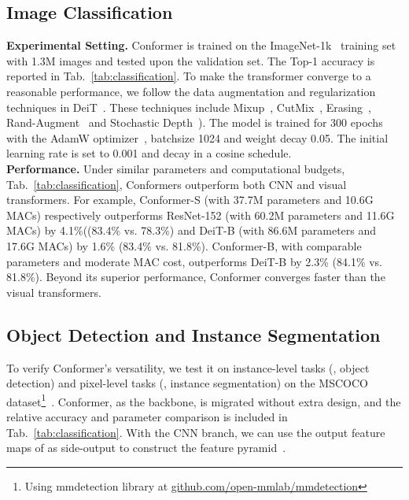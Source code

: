 \documentclass[10pt,twocolumn,letterpaper]{article}
\begin{document}
\subsection{Image Classification}

\noindent\textbf{Experimental Setting.} Conformer is trained on the ImageNet-1k~\cite{ImageNet2009} training set with 1.3M images and tested upon the validation set. The Top-1 accuracy is reported in Tab.~\ref{tab:classification}.
To make the transformer converge to a reasonable performance, we follow the data augmentation and regularization techniques in DeiT~\cite{DeiT2020}. 
These techniques include Mixup~\cite{Mixup2017}, CutMix~\cite{CutMix2019}, Erasing~\cite{Erasing2020}, Rand-Augment~\cite{RA2020} and Stochastic Depth~\cite{StochasticDepth2016}). The model is trained for 300 epochs with the AdamW optimizer~\cite{AdamW2017}, batchsize 1024 and weight decay 0.05. 
The initial learning rate is set to 0.001 and decay in a cosine schedule.
~\\

\noindent\textbf{Performance.} Under similar parameters and computational budgets, Tab.~\ref{tab:classification}, Conformers outperform both CNN and visual transformers. For example, Conformer-S (with 37.7M parameters and 10.6G MACs) respectively outperforms ResNet-152 (with 60.2M parameters and 11.6G MACs) by 4.1\%((83.4\% vs. 78.3\%) and DeiT-B (with 86.6M parameters and 17.6G MACs) by 1.6\% (83.4\% vs. 81.8\%). Conformer-B, with comparable parameters and moderate MAC cost, outperforms DeiT-B by 2.3\% (84.1\% vs. 81.8\%). Beyond its superior performance, Conformer converges faster than the visual transformers.

\subsection{Object Detection and Instance Segmentation}
To verify Conformer's versatility, we test it on instance-level tasks (, object detection) and pixel-level tasks (, instance segmentation) on the MSCOCO dataset\footnote{Using mmdetection library at \href{github.com/open-mmlab/mmdetection}{\color{magenta}github.com/open-mmlab/mmdetection}}~\cite{MSCOCO2014}. Conformer, as the backbone, is migrated without extra design, and the relative accuracy and parameter comparison is included in Tab.~\ref{tab:classification}. With the CNN branch, we can use the output feature maps of  as side-output to construct the feature pyramid~\cite{FPN2017}.
~\\
\end{document}
